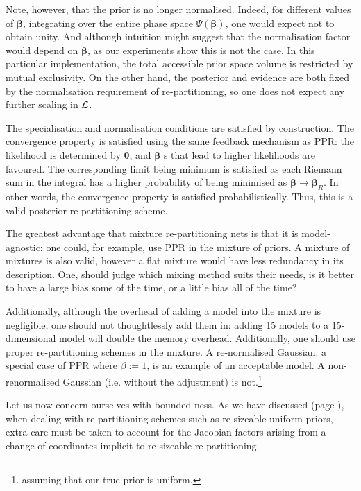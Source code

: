 \documentclass[usenatbib]{mnras}
\begin{document}
Note, however, that the prior is no longer normalised. Indeed, for
different values of \(\bm{\beta}\), integrating over the entire phase
space \(\Psi(\bm{\beta})\), one would expect not to obtain unity. And
although intuition might suggest that the normalisation factor
would depend on \(\bm{\beta}\), as our experiments show this is not the
case. In this particular implementation, the total accessible
prior space volume is restricted by mutual exclusivity. On the
other hand, the posterior and evidence are both fixed by the
normalisation requirement of re-partitioning, so one does not
expect any further scaling in \({\cal L}\). 

The specialisation and normalisation conditions are satisfied by
construction. The convergence property is satisfied using the same
feedback mechanism as PPR: the likelihood is determined by
\(\bm{\theta}\), and \(\bm{\beta}\) s that lead to higher likelihoods are
favoured. The corresponding limit being minimum is satisfied as
each Riemann sum in the integral has a higher probability of being
minimised as \(\bm{\beta}\rightarrow\bm{\beta}_{R}\). In other words, the
convergence property is satisfied probabilistically. Thus, this is
a valid posterior re-partitioning scheme.

The greatest advantage that mixture re-partitioning nets is that
it is model-agnostic: one could, for example, use PPR in the
mixture of priors. A mixture of mixtures is also valid, however a
flat mixture would have less redundancy in its description.  One,
should judge which mixing method suits their needs, is it better
to have a large bias some of the time, or a little bias all of the
time?

Additionally, although the overhead of adding a model into the
mixture is negligible, one should not thoughtlessly add them in:
adding 15 models to a 15-dimensional model will double the memory
overhead. Additionally, one should use proper re-partitioning
schemes in the mixture. A re-normalised Gaussian: a special case
of PPR where \(\beta := 1\), is an example of an acceptable model. A
non-renormalised Gaussian (i.e. without the adjustment) is
not.\footnote{assuming that our true prior is uniform.}


Let us now concern ourselves with bounded-ness. As we have
discussed (page \pageref{domain-discussion}), when dealing with
re-partitioning schemes such as re-sizeable uniform priors, extra
care must be taken to account for the Jacobian factors arising
from a change of coordinates implicit to re-sizeable
re-partitioning. 
\end{document}
